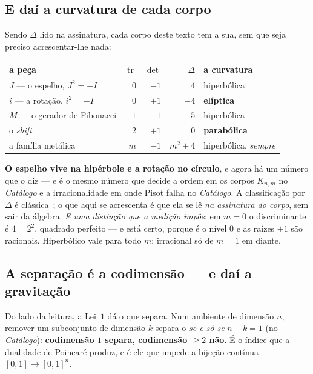 \documentclass[livro.tex]{subfiles}
\begin{document}
\subsection{E daí a curvatura de cada corpo}\label{sec:geocorpos}

Sendo $\Delta$ lido na assinatura, cada corpo deste texto tem a sua, sem que seja preciso
acrescentar-lhe nada:

\begin{center}\small
\setlength\tabcolsep{5pt}
\begin{tabular}{@{}lrrrl@{}}
\toprule
a peça & $\operatorname{tr}$ & $\det$ & $\Delta$ & a curvatura \\
\midrule
$J$ --- o espelho, $J^{2}=+I$ & $0$ & $-1$ & $4$ & hiperbólica \\
$i$ --- a rotação, $i^{2}=-I$ & $0$ & $+1$ & $-4$ & \textbf{elíptica} \\
$M$ --- o gerador de Fibonacci & $1$ & $-1$ & $5$ & hiperbólica \\
o \emph{shift} & $2$ & $+1$ & $0$ & \textbf{parabólica} \\
a família metálica & $m$ & $-1$ & $m^{2}+4$ & hiperbólica, \emph{sempre} \\
\bottomrule
\end{tabular}
\end{center}

\noindent \textbf{O espelho vive na hipérbole e a rotação no círculo}, e agora há um número que o
diz --- e é o mesmo número que decide a ordem em os corpos $K_{n,m}$ no \emph{Catálogo} e a irracionalidade em
onde Pisot falha no \emph{Catálogo}. A classificação por $\Delta$ é clássica~\cite{coxeter,berger}; o que aqui se
acrescenta é que ela se lê \emph{na assinatura do corpo}, sem sair da álgebra. \emph{E uma distinção que a medição impôs}: em $m=0$ o discriminante é $4=2^{2}$, quadrado
perfeito --- e está certo, porque é o nível $0$ e as raízes $\pm1$ são racionais. Hiperbólico vale
para todo $m$; irracional só de $m=1$ em diante.

\subsection{A separação é a codimensão --- e daí a gravitação}\label{sec:geograv}

Do lado da leitura, a Lei~$1$ dá o que separa. Num ambiente de dimensão $n$, remover um subconjunto
de dimensão $k$ separa-o \emph{se e só se} $n-k=1$ (no \emph{Catálogo}): \textbf{codimensão $1$
separa, codimensão $\geq2$ não}. É o índice que a dualidade de Poincaré produz, e é ele que impede a
bijeção contínua $[0,1]\to[0,1]^{n}$.
\end{document}
